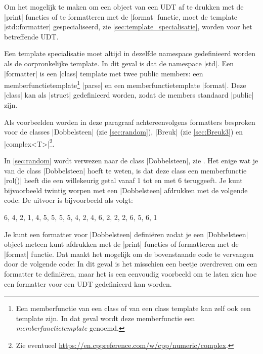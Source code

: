 \begin{cpplstShortInline}
\label{sec:userdefinedformatter}
Om het mogelijk te maken om een object van een UDT af te drukken met de |print| functies of te formatteren met de |format| functie, moet de template |std::formatter| gespecialiseerd, zie \cref{sec:template_specialisatie}, worden voor het betreffende UDT.

Een template specialisatie moet altijd in dezelfde namespace gedefinieerd worden als de oorpronkelijke template. 
In dit geval is dat de namespace |std|.
Een |formatter| is een |class| template met twee public members: een memberfunctietemplate\footnote{%
	Een memberfunctie van een class of van een class template kan zelf ook een template zijn.
	In dat geval wordt deze memberfunctie een \emph{memberfunctietemplate} genoemd.
} |parse| en een memberfunctietemplate |format|.
Deze |class| kan als |struct| gedefinieerd worden, zodat de members standaard |public| zijn.

Als voorbeelden worden in deze paragraaf achtereenvolgens formatters besproken voor de classes |Dobbelsteen| (zie \cref{sec:random}), |Breuk| (zie \cref{sec:Breuk3}) en |complex<T>|\footnote{%
	Zie eventueel \url{https://en.cppreference.com/w/cpp/numeric/complex}.
}.

In \cref{sec:random} wordt verwezen naar de class |Dobbelsteen|, zie .
Het enige wat je van de class |Dobbelsteen| hoeft te weten, is dat deze class een memberfunctie |rol()| heeft die een willekeurig getal vanaf 1 tot en met 6 teruggeeft.
Je kunt bijvoorbeeld twintig worpen met een |Dobbelsteen| afdrukken met de volgende code:
De uitvoer is bijvoorbeeld als volgt:
\begin{coutput}
6, 4, 2, 1, 4, 5, 5, 5, 5, 4, 2, 4, 6, 2, 2, 2, 6, 5, 6, 1
\end{coutput}

Je kunt een formatter voor |Dobbelsteen| definiëren zodat je een |Dobbelsteen| object meteen kunt afdrukken met de |print| functies of formatteren met de |format| functie.
Dat maakt het mogelijk om de bovenstaande code te vervangen door de volgende code:
\label{format_Dobbelsteen_simple.cpp}
In dit geval is het misschien een beetje overdreven om een formatter te definiëren, maar het is een eenvoudig voorbeeld om te laten zien hoe een formatter voor een UDT gedefinieerd kan worden.


\end{cpplstShortInline}
